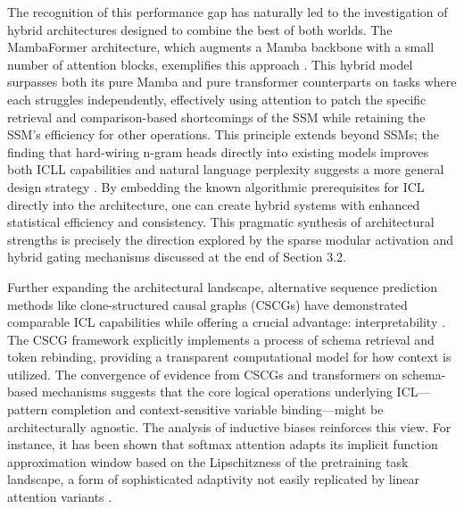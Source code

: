 \documentclass[11pt]{article}
\begin{document}
The recognition of this performance gap has naturally led to the investigation of hybrid architectures designed to combine the best of both worlds. The MambaFormer architecture, which augments a Mamba backbone with a small number of attention blocks, exemplifies this approach \cite{ref88}. This hybrid model surpasses both its pure Mamba and pure transformer counterparts on tasks where each struggles independently, effectively using attention to patch the specific retrieval and comparison-based shortcomings of the SSM while retaining the SSM's efficiency for other operations. This principle extends beyond SSMs; the finding that hard-wiring n-gram heads directly into existing models improves both ICLL capabilities and natural language perplexity suggests a more general design strategy \cite{ref60}. By embedding the known algorithmic prerequisites for ICL directly into the architecture, one can create hybrid systems with enhanced statistical efficiency and consistency. This pragmatic synthesis of architectural strengths is precisely the direction explored by the sparse modular activation and hybrid gating mechanisms discussed at the end of Section 3.2.

Further expanding the architectural landscape, alternative sequence prediction methods like clone-structured causal graphs (CSCGs) have demonstrated comparable ICL capabilities while offering a crucial advantage: interpretability \cite{ref64}. The CSCG framework explicitly implements a process of schema retrieval and token rebinding, providing a transparent computational model for how context is utilized. The convergence of evidence from CSCGs and transformers on schema-based mechanisms suggests that the core logical operations underlying ICL---pattern completion and context-sensitive variable binding---might be architecturally agnostic. The analysis of inductive biases reinforces this view. For instance, it has been shown that softmax attention adapts its implicit function approximation window based on the Lipschitzness of the pretraining task landscape, a form of sophisticated adaptivity not easily replicated by linear attention variants \cite{ref65}.
\end{document}
